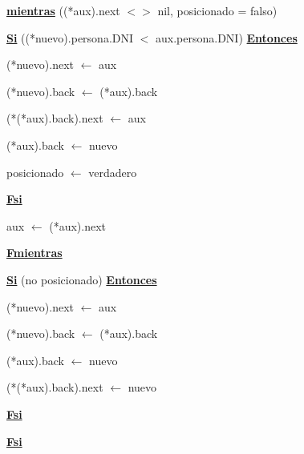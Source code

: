 \documentclass{article}
\begin{document}
                \hspace{20mm}\underline{\textbf{mientras}} ((*aux).next $<>$ nil, posicionado = falso)

                    \hspace{24mm}\underline{\textbf{Si}} ((*nuevo).persona.DNI $<$ aux.persona.DNI) \underline{\textbf{Entonces}}

                        \hspace{28mm}(*nuevo).next $\leftarrow$ aux

                        \hspace{28mm}(*nuevo).back $\leftarrow$ (*aux).back

                        \hspace{28mm}(*(*aux).back).next $\leftarrow$ aux

                        \hspace{28mm}(*aux).back $\leftarrow$ nuevo

                        \hspace{28mm}posicionado $\leftarrow$ verdadero

                    \hspace{24mm}\underline{\textbf{Fsi}}

                    \hspace{24mm}aux $\leftarrow$ (*aux).next

                \hspace{20mm}\underline{\textbf{Fmientras}}

                \hspace{20mm}\underline{\textbf{Si}} (no posicionado) \underline{\textbf{Entonces}}

                    \hspace{24mm}(*nuevo).next $\leftarrow$ aux

                    \hspace{24mm}(*nuevo).back $\leftarrow$ (*aux).back

                    \hspace{24mm}(*aux).back $\leftarrow$ nuevo

                    \hspace{24mm}(*(*aux).back).next $\leftarrow$ nuevo

                \hspace{20mm}\underline{\textbf{Fsi}}

            \hspace{16mm}\underline{\textbf{Fsi}}
\end{document}
